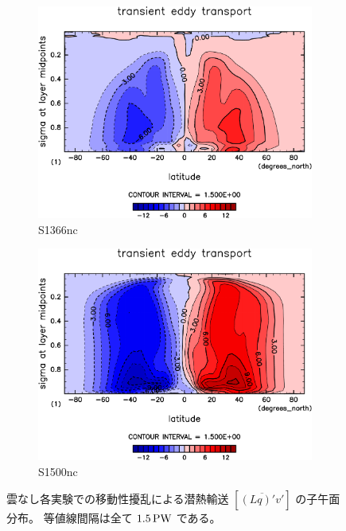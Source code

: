 \documentclass[body]{subfiles}
\begin{document}
\begin{figure}[t]
	\centering
	\begin{subfigure}{.4\textwidth}
		\centering
		\includegraphics[width=\textwidth]{S1366-nc/MeriHeatTransTest@latentEn_TE,time=3650:4015-crop-rotate.pdf}
		\caption{S1366nc}\label{潜熱移動性擾乱S1366nc}
	\end{subfigure}
	\begin{subfigure}{.4\textwidth}
		\centering
		\includegraphics[width=\textwidth]{S1500-nc/MeriHeatTransTest@latentEn_TE,time=3650:4015-crop-rotate.pdf}
		\caption{S1500nc}\label{潜熱移動性擾乱S1500nc}
	\end{subfigure}
	\caption[雲なし各実験での移動性擾乱による潜熱輸送の子午面分布]{
		雲なし各実験での移動性擾乱による潜熱輸送 \([\overline{(Lq)'v'}]\) の子午面分布。
		等値線間隔は全て \(1.5\hmu{PW}\) である。
	}\label{潜熱移動性擾乱nc}
\end{figure}
\end{document}
